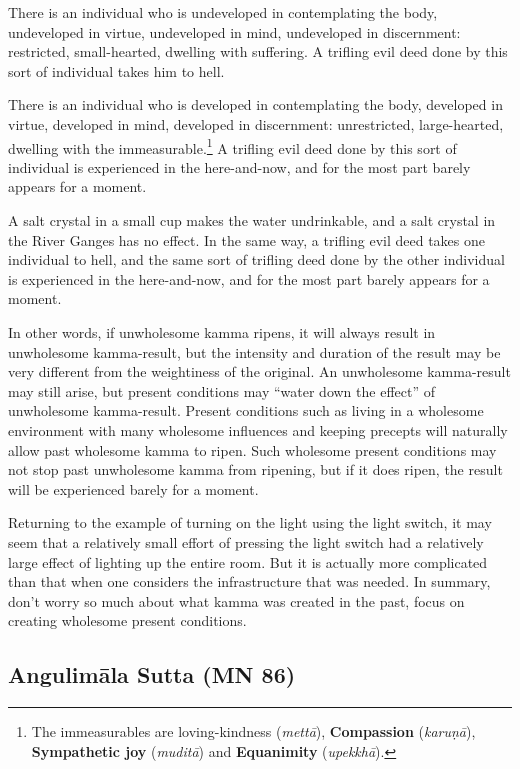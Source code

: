 \color {black}

There is an individual who is undeveloped in contemplating the body, undeveloped in virtue, undeveloped in mind, undeveloped in discernment: restricted, small-hearted, dwelling with suffering. A trifling evil deed done by this sort of individual takes him to hell.

There is an individual who is developed in contemplating the body, developed in virtue, developed in mind, developed in discernment: unrestricted, large-hearted, dwelling with the immeasurable.\footnote{The immeasurables are loving-kindness (\textit{mettā}), \textbf{Compassion} (\textit{karuṇā}), \textbf{Sympathetic joy} (\textit{muditā}) and \textbf{Equanimity} (\textit{upekkhā}).} A trifling evil deed done by this sort of individual is experienced in the here-and-now, and for the most part barely appears for a moment.

A salt crystal in a small cup makes the water undrinkable, and a salt crystal in the River Ganges has no effect. In the same way, a trifling evil deed takes one individual to hell, and the same sort of trifling deed done by the other individual is experienced in the here-and-now, and for the most part barely appears for a moment.

In other words, if unwholesome kamma ripens, it will always result in unwholesome kamma-result, but the intensity and duration of the result may be very different from the weightiness of the original. An unwholesome kamma-result may still arise, but present conditions may “water down the effect” of unwholesome kamma-result. Present conditions such as living in a wholesome environment with many wholesome influences and keeping precepts will naturally allow past wholesome kamma to ripen. Such wholesome present conditions may not stop past unwholesome kamma from ripening, but if it does ripen, the result will be experienced barely for a moment.

Returning to the example of turning on the light using the light switch, it may seem that a relatively small effort of pressing the light switch had a relatively large effect of lighting up the entire room. But it is actually more complicated than that when one considers the infrastructure that was needed. In summary, don’t worry so much about what kamma was created in the past, focus on creating wholesome present conditions.

\pagebreak

\subsection*{Angulimāla Sutta (MN 86)}

